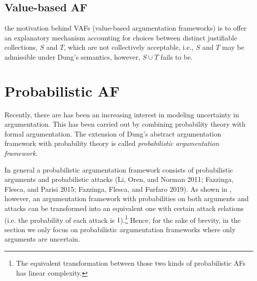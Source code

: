\subsection{Value-based AF}


the motivation behind VAFs (value-based argumentation frameworks) is to offer an explanatory mechanism accounting for choices between distinct justifiable collections, 
$S$ and $T$, 
which are not collectively acceptable, 
i.e., $S$ and $T$ may be admissible under Dung's semantics, 
however, $S \cup T$ fails to be. 






\section{Probabilistic AF}

Recently, 
there are has been an increasing interest in modeling uncertainty in argumentation. 
% 
This has been carried out by combining probability theory with formal argumentation.
% 
The extension of Dung's abstract argumentation framework with probability theory is called \textit{probabilistic argumentation framework}.




In general a probabilistic argumentation framework consists of probabilistic arguments and probabilistic attacks  (Li, Oren, and Norman 2011; Fazzinga, Flesca, and Parisi 2015; Fazzinga, Flesca, and Furfaro 2019).
% 
As shown in \cite{Man.Bis2020},%
however, 
an argumentation framework with probabilities on both arguments and attacks can be transformed into an equivalent one with certain attack relations (i.e. the probability of each attack is $1$).\footnote{
    The equivalent transformation between those two kinds of probabilistic AFs has linear complexity.
}
Hence, 
for the sake of brevity, 
in the section we only focus on probabilistic argumentation frameworks where only arguments are uncertain.





